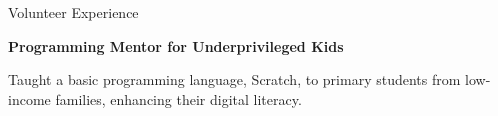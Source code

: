 \begin{rubric}{Volunteer Experience}

\entry*[Aug 2019]
    \textbf{Programming Mentor for Underprivileged Kids}\par
    Taught a basic programming language, Scratch, to primary students from low-income families, enhancing their digital literacy.

\end{rubric}
